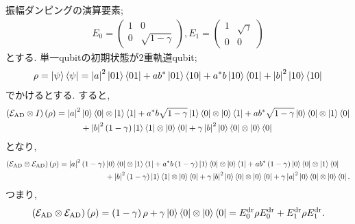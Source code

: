 \begin{ex}
    \label{ex8.23}
    振幅ダンピングの演算要素;
    \begin{align*}
        E_0 =
        \begin{pmatrix}
            1 & 0                \\
            0 & \sqrt{1- \gamma}
        \end{pmatrix}
        ,
        E_1 =
        \begin{pmatrix}
            1 & \sqrt{\gamma} \\
            0 & 0
        \end{pmatrix}
    \end{align*}
    とする.
    単一qubitの初期状態が2重軌道qubit;
    \begin{align*}
        \rho
        = \ket{\psi} \bra{\psi}
        =
        \left| a \right|^2 \ket{01} \bra{01}
        + a b^* \ket{01} \bra{10}
        + a^* b \ket{10} \bra{01}
        + \left| b \right|^2 \ket{10} \bra{10}
    \end{align*}
    でかけるとする. すると,
    \begin{align*}
        \left( \mathcal{E}_\mathrm{AD} \otimes I \right)
        \left( \rho\right)
        =
        \left| a \right|^2 & \ket{0}\bra{0} \otimes \ket{1}\bra{1}
        + a^* b \sqrt{1 - \gamma} \ket{1}\bra{0} \otimes \ket{0}\bra{1}
        + ab^* \sqrt{1- \gamma} \ket{0}\bra{0} \otimes \ket{1}\bra{0}
        \\
                           & +  \left| b \right|^2 \left( 1 - \gamma \right)  \ket{1}\bra{1} \otimes \ket{0}\bra{0}
        + \gamma \left| b \right|^2 \ket{0}\bra{0} \otimes \ket{0} \bra{0}
    \end{align*}
    となり,
    \begin{align*}
        \left( \mathcal{E}_\mathrm{AD} \otimes \mathcal{E}_\mathrm{AD} \right)
        \left( \rho\right)
        =
        \left| a \right|^2 \left( 1- \gamma \right) & \ket{0}\bra{0} \otimes \ket{1}\bra{1}
        + a^* b\left( 1- \gamma\right) \ket{1}\bra{0} \otimes \ket{0}\bra{1}
        + ab^* \left( 1- \gamma\right) \ket{0}\bra{0} \otimes \ket{1}\bra{0}
        \\
                                                    & +  \left| b \right|^2 \left( 1 - \gamma \right)  \ket{1}\bra{1} \otimes \ket{0}\bra{0}
        + \gamma \left| b \right|^2 \ket{0}\bra{0} \otimes \ket{0} \bra{0}
        + \gamma \left| a \right|^2 \ket{0}\bra{0} \otimes \ket{0} \bra{0}.
    \end{align*}
    つまり,
    \begin{align*}
        \left( \mathcal{E}_\mathrm{AD} \otimes \mathcal{E}_\mathrm{AD} \right)
        \left( \rho\right)
        =
        \left( 1 - \gamma \right) \rho + \gamma \ket{0}\bra{0} \otimes \ket{0}\bra{0}
        =
        E_0^{\mathrm{dr}} \rho E_0^{\mathrm{dr}} + E_1^{\mathrm{dr}} \rho E_1^{\mathrm{dr}}.
    \end{align*}
\end{ex}

